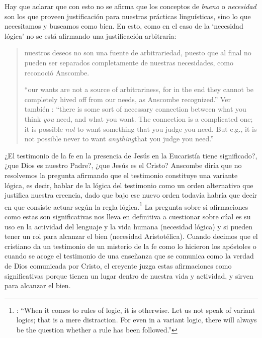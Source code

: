 Hay que aclarar que con esto no se afirma que los conceptos de \emph{bueno} o \emph{necesidad} son los que proveen justificación para nuestras prácticas linguísticas, sino lo que necesitamos y buscamos como bien. En esto, como en el caso de la `necesidad lógica' no se está afirmando una justificación arbitraria: \blockquote[{\cite[221]{teichmann2008ans}} \enquote{our wants are not a source of arbitrariness, for in the end they cannot be completely hived off from our needs, as Anscombe recognized.} Ver también {\cite[31]{anscombe1981erp:mmph}}: \enquote{there is some sort of necessary connection between what you think \emph{you} need, and what you want. The connection is a complicated one; it is possible \emph{not} to want something that you judge you need. But e.g., it is not possible never to want \emph{anything}that you judge you need.}]{nuestros deseos no son una fuente de arbitrariedad, puesto que al final no pueden ser separados completamente de nuestras necesidades, como reconoció Anscombe.}

¿El testimonio de la fe en la presencia de Jesús en la Eucaristía tiene significado?, ¿que Dios es nuestro Padre?, ¿que Jesús es el Cristo? Anscombe diría que no resolvemos la pregunta afirmando que el testimonio constituye una variante lógica, es decir, hablar de la lógica del testimonio como un orden alternativo que justifica nuestra creencia, dado que bajo ese nuevo orden todavía habría que decir en que consiste actuar según la regla lógica.\footnote{\cite[Cf.~][102]{anscombe1981erp:rrp}: \enquote{When it comes to rules of logic, it is otherwise. Let us not speak of variant logics; that is a mere distraction. For even in a variant logic, there will always be the question whether a rule has been followed.}} La pregunta sobre si afirmaciones como estas son significativas nos lleva en definitiva a cuestionar sobre cúal es su uso en la actividad del lenguaje y la vida humana (necesidad lógica) y si pueden tener un rol para alcanzar el bien (necesidad Aristotélica). Cuando decimos que el cristiano da un testimonio de un misterio de la fe como lo hicieron los apóstoles o cuando se acoge el testimonio de una enseñanza que se comunica como la verdad de Dios comunicada por Cristo, el creyente juzga estas afirmaciones como significativas porque tienen un lugar dentro de nuestra vida y actividad, y sirven para alcanzar el bien.
